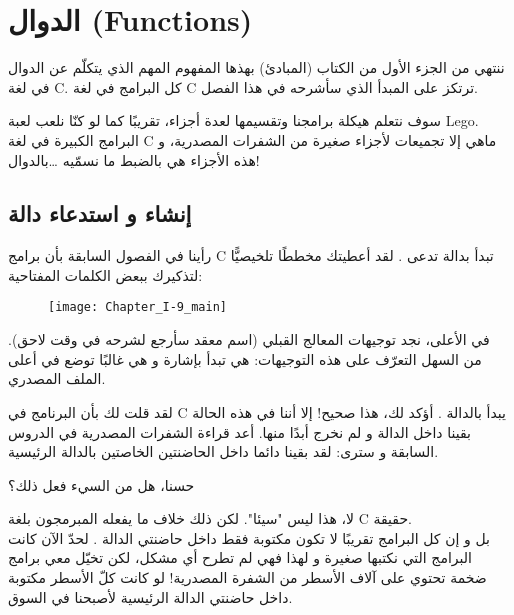 \chapter{الدوال (\textenglish{Functions})}

ننتهي من الجزء الأول من الكتاب (المبادئ) بهذها المفهوم المهم الذي يتكلّم عن الدوال في لغة
\textenglish{C}.
كل البرامج في لغة  
\textenglish{C}
ترتكز على المبدأ الذي سأشرحه في هذا الفصل.

سوف نتعلم هيكلة برامجنا وتقسيمها لعدة أجزاء، تقريبًا كما لو كنّا نلعب لعبة
\textenglish{Lego}.\\
البرامج الكبيرة في لغة 
\textenglish{C}
ماهي إلا تجميعات لأجزاء صغيرة من الشفرات المصدرية، و هذه الأجزاء هي بالضبط ما نسمّيه \dots بالدوال!

\section{إنشاء و استدعاء دالة}

رأينا في الفصول السابقة بأن برامج \textenglish{C}
تبدأ بدالة تدعى 
.
لقد أعطيتك مخططًا تلخيصيًّا لتذكيرك ببعض الكلمات المفتاحية:

\begin{figure}[H]
	\centering
	\texttt{[image: Chapter\_I-9\_main]}
\end{figure}

في الأعلى، نجد توجيهات المعالج القبلي (اسم معقد سأرجع لشرحه في وقت لاحق). من السهل التعرّف على هذه التوجيهات: هي تبدأ بإشارة 
\InlineCode{\#}
و هي غالبًا توضع في أعلى الملف المصدري.

لقد قلت لك بأن البرنامج في \textenglish{C}
يبدأ بالدالة
.
 أؤكد لك، هذا صحيح! إلا أننا في هذه الحالة بقينا داخل الدالة 
و لم نخرج أبدًا منها. أعد قراءة الشفرات المصدرية في الدروس السابقة و سترى: لقد بقينا دائما داخل الحاضنتين الخاصتين بالدالة الرئيسية.

\begin{question}
حسنا، هل من السيء فعل ذلك؟
\end{question}

لا، هذا ليس "سيئا". لكن ذلك خلاف ما يفعله المبرمجون بلغة
\textenglish{C}
حقيقة.\\
بل و إن كل البرامج تقريبًا لا تكون مكتوبة فقط داخل  حاضنتي الدالة 
.
لحدّ الآن كانت البرامج التي نكتبها صغيرة و لهذا فهي لم تطرح أي مشكل، لكن تخيّل معي برامج ضخمة تحتوي على آلاف الأسطر من الشفرة المصدرية! لو كانت كلّ الأسطر مكتوبة داخل حاضنتي الدالة الرئيسية لأصبحنا في السوق.

